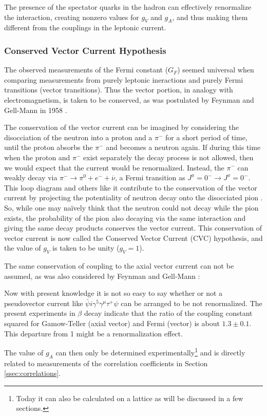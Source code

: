 The presence of the spectator quarks in the hadron
can effectively renormalize the interaction, creating
nonzero values for $g_V$ and $g_A$, and thus making them different from the
couplings in the leptonic current.

\subsubsection{Conserved Vector Current Hypothesis}

The observed measurements of the Fermi constant ($G_F$) seemed
universal when comparing measurements from
purely leptonic ineractions and purely Fermi transitions (vector transitions).
Thus the vector portion, in analogy with
electromagnetism, is taken to be conserved, as was postulated by Feynman and Gell-Mann in
1958 \cite{feynman1958}. 

The conservation of the vector current can be imagined by considering the disocciation of the neutron
into a proton and a $\pi^{-}$ for a short period of time, until the proton absorbs the
$\pi^{-}$ and becomes a neutron again. If during this time when the proton and $\pi^{-}$ exist separately
the decay process is not allowed, then we would expect that the current would be renormalized.
Instead, the $\pi^{-}$ can weakly decay via $\pi^- \rightarrow \pi^0+e^- + \overline{\nu}$,
a Fermi transition as $J^\pi=0^- \rightarrow J^\pi=0^-$. This loop diagram and others like it contribute to the
conservation of the vector current by projecting
the potentiality of neutron decay onto the disocciated pion \cite{grotz1990}. So, while one may na\"{i}vely
think that the neutron could not decay while the pion exists, the probability of the pion also decaying
via the same interaction and giving the same decay products conserves the vector current.
This conservation of vector current is now called the
Conserved Vector Current (CVC) hypothesis, and the value of $g_V$ is taken to be unity ($g_V = 1$).

The same conservation of coupling to the axial vector current can not be assumed, as was also 
considered by Feynman and Gell-Mann \cite{feynman1958}:
%
\begin{displayquote}
Now with present knowledge it is not so easy to say
whether or not a pseudovector current like
$\bar{\psi}i\gamma^5\gamma^\mu\tau^+\psi$
can be arranged to be not renormalized. The present
experiments in $\beta$ decay indicate that the ratio of the
coupling constant squared for Gamow-Teller (axial vector) and Fermi
(vector)
is about $1.3\pm0.1$. This departure from 1 might be a
renormalization effect.
\end{displayquote}
%
The value of $g_A$ can then only be determined experimentally\footnote{Today it can also be calculated on
  a lattice as will be discussed in a few sections.} and is directly related to measurements
of the correlation coefficients in Section \ref{ssec:correlations}.


